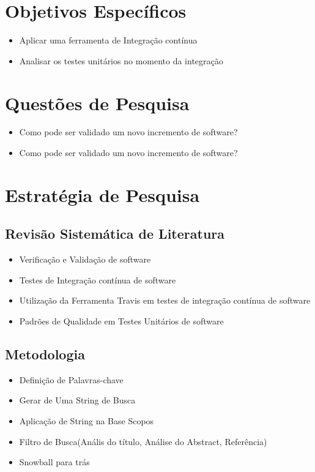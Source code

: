 \section{Objetivos Específicos }
\begin{itemize}
    \item Aplicar uma ferramenta de Integração contínua
    \item Analisar os testes unitários no momento da integração
\end{itemize}
\section{Questões de Pesquisa}
\begin{itemize}
    \item Como pode ser validado um novo incremento de software?
    \item Como pode ser validado um novo incremento de software?
\end{itemize}
\section{Estratégia de Pesquisa}
\subsection{Revisão Sistemática de Literatura}
\begin{itemize}
    \item Verificação e Validação de software
    \item Testes de Integração contínua de software
    \item  Utilização da Ferramenta Travis em testes de integração contínua de software
    \item Padrões de Qualidade em Testes Unitários de software
\end{itemize}

\subsection{Metodologia}
\begin{itemize}
    \item Definição de Palavras-chave
    \item Gerar de Uma String de Busca
    \item Aplicação de String na Base Scopos
    \item Filtro de Busca(Anális do título, Análise do Abstract, Referência)
    \item Snowball para trás
\end{itemize}

